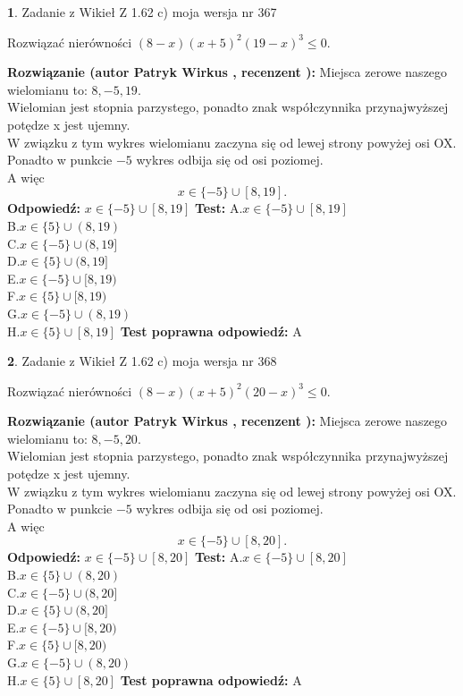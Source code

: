 \documentclass[12pt, a4paper]{article}
\theoremstyle{definition} %
\newtheorem{zad}{}
\newcommand{\zadStart}[1]{\begin{zad}#1\newline}
\newcommand{\zadStop}{\end{zad}}
\newcommand{\rozwStart}[2]{\noindent \textbf{Rozwiązanie (autor #1 , recenzent #2): }\newline}
\newcommand{\rozwStop}{\newline}
\newcommand{\odpStart}{\noindent \textbf{Odpowiedź:}\newline}
\newcommand{\odpStop}{\newline}
\newcommand{\testStart}{\noindent \textbf{Test:}\newline}
\newcommand{\testStop}{\newline}
\newcommand{\kluczStart}{\noindent \textbf{Test poprawna odpowiedź:}\newline}
\newcommand{\kluczStop}{\newline}
\begin{document}
\zadStart{Zadanie z Wikieł Z 1.62 c) moja wersja nr 367}

Rozwiązać nierówności $(8-x)(x+5)^{2}(19-x)^{3}\le0$.
\zadStop
\rozwStart{Patryk Wirkus}{}
Miejsca zerowe naszego wielomianu to: $8, -5, 19$.\\
Wielomian jest stopnia parzystego, ponadto znak współczynnika przy\linebreak najwyższej potędze x jest ujemny.\\ W związku z tym wykres wielomianu zaczyna się od lewej strony powyżej osi OX.\\
Ponadto w punkcie $-5$ wykres odbija się od osi poziomej.\\
A więc $$x \in \{-5\} \cup [8,19].$$
\rozwStop
\odpStart
$x \in \{-5\} \cup [8,19]$
\odpStop
\testStart
A.$x \in \{-5\} \cup [8,19]$\\
B.$x \in \{5\} \cup (8,19)$\\
C.$x \in \{-5\} \cup (8,19]$\\
D.$x \in \{5\} \cup (8,19]$\\
E.$x \in \{-5\} \cup [8,19)$\\
F.$x \in \{5\} \cup [8,19)$\\
G.$x \in \{-5\} \cup (8,19)$\\
H.$x \in \{5\} \cup [8,19]$
\testStop
\kluczStart
A
\kluczStop



\zadStart{Zadanie z Wikieł Z 1.62 c) moja wersja nr 368}

Rozwiązać nierówności $(8-x)(x+5)^{2}(20-x)^{3}\le0$.
\zadStop
\rozwStart{Patryk Wirkus}{}
Miejsca zerowe naszego wielomianu to: $8, -5, 20$.\\
Wielomian jest stopnia parzystego, ponadto znak współczynnika przy\linebreak najwyższej potędze x jest ujemny.\\ W związku z tym wykres wielomianu zaczyna się od lewej strony powyżej osi OX.\\
Ponadto w punkcie $-5$ wykres odbija się od osi poziomej.\\
A więc $$x \in \{-5\} \cup [8,20].$$
\rozwStop
\odpStart
$x \in \{-5\} \cup [8,20]$
\odpStop
\testStart
A.$x \in \{-5\} \cup [8,20]$\\
B.$x \in \{5\} \cup (8,20)$\\
C.$x \in \{-5\} \cup (8,20]$\\
D.$x \in \{5\} \cup (8,20]$\\
E.$x \in \{-5\} \cup [8,20)$\\
F.$x \in \{5\} \cup [8,20)$\\
G.$x \in \{-5\} \cup (8,20)$\\
H.$x \in \{5\} \cup [8,20]$
\testStop
\kluczStart
A
\kluczStop
\end{document}
